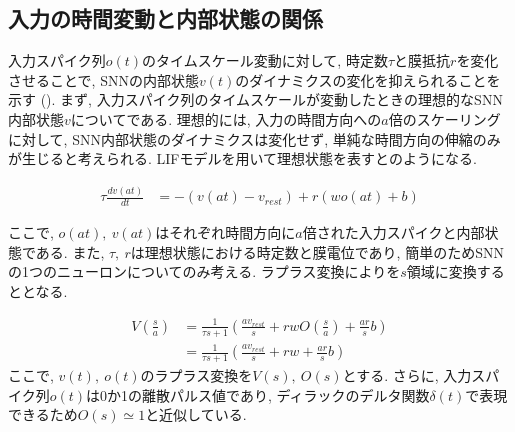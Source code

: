 \makeatletter %
\subsection{入力の時間変動と内部状態の関係}

入力スパイク列$o\left(t\right)$のタイムスケール変動に対して, 時定数$\tau$と膜抵抗$r$を変化させることで, SNNの内部状態$v\left(t\right)$のダイナミクスの変化を抑えられることを示す ().
まず, 入力スパイク列のタイムスケールが変動したときの理想的なSNN内部状態$v$についてである.
理想的には, 入力の時間方向への$a$倍のスケーリングに対して, SNN内部状態のダイナミクスは変化せず, 単純な時間方向の伸縮のみが生じると考えられる.
LIFモデルを用いて理想状態を表すとのようになる.

\begin{equation}
    \begin{split}
        \tau \frac{dv\left(at\right)}{dt} &= -\left(v\left(at\right)-v_{rest}\right) + r\left(w o\left(at\right) + b\right)
    \end{split}
    \label{sec2:eq:ideal}
\end{equation}

ここで, $o\left(at\right),~v\left(at\right)$はそれぞれ時間方向に$a$倍された入力スパイクと内部状態である.
また, $\tau,~r$は理想状態における時定数と膜電位であり, 簡単のためSNNの1つのニューロンについてのみ考える.
ラプラス変換によりを$s$領域に変換するととなる.

\begin{equation}
    \begin{split}
        V\left(\frac{s}{a}\right) &= \frac{1}{\tau s+1}\left(\frac{a v_{rest}}{s}+r w O\left(\frac{s}{a}\right)+\frac{ar}{s}b\right)\\
        &= \frac{1}{\tau s+1}\left(\frac{a v_{rest}}{s}+r w +\frac{ar}{s}b\right)
    \end{split}
    \label{sec2:eq:ideal_laplace}
\end{equation}
ここで, $v\left(t\right),~o\left(t\right)$のラプラス変換を$V\left(s\right), ~ O\left(s\right)$とする.
さらに, 入力スパイク列$o\left(t\right)$は0か1の離散パルス値であり, ディラックのデルタ関数$\delta\left(t\right)$で表現できる\cite{Henkes2024}ため$O\left(s\right)\simeq1$と近似している.

